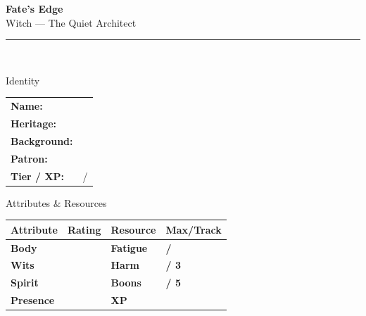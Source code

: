 \documentclass[10pt]{article}
\begin{document}
\begin{center}
    {\Huge\bfseries\sffamily\color{edgered} Fate's Edge}\\[0.2em]
    {\large\sffamily Witch --- The Quiet Architect}\\[0.5em]
    \rule{0.5\textwidth}{0.5pt}\\[1em]
\end{center}

\begin{minipage}[t]{0.48\linewidth}
    \begin{charbox}{Identity}
        \begin{tabular}{p{2.5cm} p{5cm}}
            \textbf{Name:} & \underline{\hspace{4cm}} \\
            \textbf{Heritage:} & \underline{\hspace{4cm}} \\
            \textbf{Background:} & \underline{\hspace{4cm}} \\
            \textbf{Patron:} & \underline{\hspace{4cm}} \\
            \textbf{Tier / XP:} & \underline{\hspace{2cm}} / \underline{\hspace{2cm}} \\
        \end{tabular}
    \end{charbox}
    
    \vspace{0.5em}
    
    \begin{charbox}{Attributes \& Resources}
        \begin{tabular}{>{\bfseries}p{2.5cm} >{\bfseries}p{1.5cm} >{\bfseries}p{2.5cm} >{\bfseries}p{1.5cm}}
            \toprule
            \textbf{Attribute} & \textbf{Rating} & \textbf{Resource} & \textbf{Max/Track} \\
            \midrule
            Body & \underline{\hspace{1.5cm}} & Fatigue & \underline{\hspace{1.5cm}} / \underline{\hspace{1.5cm}} \\
            Wits & \underline{\hspace{1.5cm}} & Harm & \underline{\hspace{1.5cm}} / 3 \\
            Spirit & \underline{\hspace{1.5cm}} & Boons & \underline{\hspace{1.5cm}} / 5 \\
            Presence & \underline{\hspace{1.5cm}} & XP & \underline{\hspace{1.5cm}} \\
            \bottomrule
        \end{tabular}
    \end{charbox}
    

\end{minipage}
\end{document}
